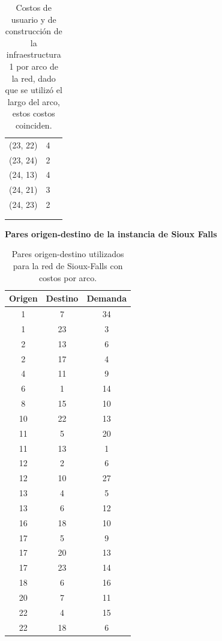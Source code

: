 \documentclass{article}
\begin{document}
\begin{table}[h!]
\begin{tabular}{ccc}
        (23, 22) & 4 \\
        (23, 24) & 2 \\
        (24, 13) & 4 \\
        (24, 21) & 3 \\
        (24, 23) & 2 \\
         & \\
         & \\
      \bottomrule
    \end{tabular}
    \caption{Costos de usuario y de construcción de la infraestructura 1 por arco de la red, dado que se utilizó el largo del arco, estos costos coinciden.}\label{table:siouxfallsgraphdata}
  \end{table}

  \begin{table}[h!]
    \centering
    \caption*{{\bf Pares origen-destino de la instancia de Sioux Falls}}
    \begin{tabular}{ccc}
      \toprule
        Origen & Destino & Demanda \\
      \midrule
        1 & 7 & 34 \\
        1 & 23 & 3 \\
        2 & 13 & 6 \\
        2 & 17 & 4 \\
        4 & 11 & 9 \\
        6 & 1 & 14 \\
        8 & 15 & 10 \\
        10 & 22 & 13 \\
        11 & 5 & 20 \\
        11 & 13 & 1 \\
        12 & 2 & 6 \\
        12 & 10 & 27 \\
        13 & 4 & 5 \\
        13 & 6 & 12 \\
        16 & 18 & 10 \\
        17 & 5 & 9 \\
        17 & 20 & 13 \\
        17 & 23 & 14 \\
        18 & 6 & 16 \\
        20 & 7 & 11 \\
        22 & 4 & 15 \\
        22 & 18 & 6 \\
      \bottomrule
    \end{tabular}
    \caption{Pares origen-destino utilizados para la red de Sioux-Falls con costos por arco.}\label{table:siouxfallsdemanddata}
  \end{table}
\end{document}
